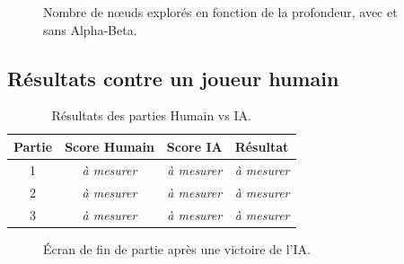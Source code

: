 \documentclass[12pt, a4paper]{article}
\begin{document}
\begin{figure}[H]
    \centering
    \caption{Nombre de nœuds explorés en fonction de la profondeur, avec et sans Alpha-Beta.}
    \label{fig:noeuds}
\end{figure}


\subsection{Résultats contre un joueur humain}


\begin{table}[H]
\centering
\caption{Résultats des parties Humain vs IA.}
\label{tab:humain_ia}
\begin{tabular}{@{} c c c l @{}}
\toprule
\textbf{Partie} & \textbf{Score Humain} & \textbf{Score IA} & \textbf{Résultat} \\
\midrule
1 & \textit{à mesurer} & \textit{à mesurer} & \textit{à mesurer} \\
2 & \textit{à mesurer} & \textit{à mesurer} & \textit{à mesurer} \\
3 & \textit{à mesurer} & \textit{à mesurer} & \textit{à mesurer} \\
\bottomrule
\end{tabular}
\end{table}

\begin{figure}[H]
    \centering
    \caption{Écran de fin de partie après une victoire de l'IA.}
    \label{fig:fin}
\end{figure}


\end{document}
